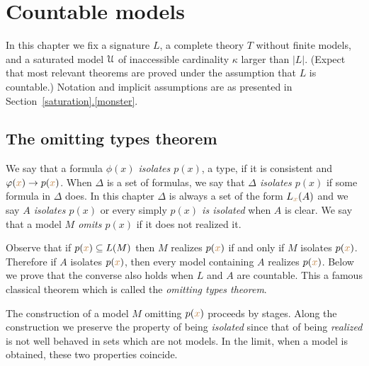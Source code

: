 \documentclass[creche.tex]{subfiles}
\begin{document}
\chapter{Countable models}
\label{countable}

\def\ceq#1#2#3{\parbox[b]{30ex}{$\displaystyle #1$}\parbox[b]{6ex}{\hfil$#2$}$\displaystyle #3$}




In this chapter we fix a signature $L$, a complete theory $T$ without finite models, and a saturated model $\EuScript U$ of inaccessible cardinality $\kappa$ larger than $|L|$. (Expect that most relevant theorems are proved under the assumption that $L$ is countable.) Notation and implicit assumptions are as presented in Section~\hyperref[saturation]{\ref*{saturation}.\ref*{monster}}.



\section{The omitting types theorem}\label{omttingtype}

We say that a formula \emph{$\phi(x)$ isolates $p(x)$}, a type, if it is consistent and $\varphi({\color{brown} x})\rightarrow p({\color{brown} x})$. When $\Delta$ is a set of formulas, we say that \emph{$\Delta$ isolates $p(x)$\/} if some formula in $\Delta$ does. In this chapter $\Delta$ is always a set of the form $L_{{\color{brown} x}}(A)$ and we say  \emph{$A$ isolates $p(x)$\/} or every simply \emph{$p(x)$ is isolated\/} when $A$ is clear. We say that a model \emph{$M$ omits $p(x)$\/} if it does not realized it. 

Observe that if $p({\color{brown} x})\subseteq L(M)$ then $M$ realizes $p({\color{brown} x})$ if and only if $M$ isolates  $p({\color{brown} x})$. Therefore if $A$ isolates $p({\color{brown} x})$, then every model containing $A$ realizes $p({\color{brown} x})$. Below we prove that the converse also holds when $L$ and $A$ are countable. This a famous classical theorem  which is called the \textit{omitting types theorem}. 

The construction of a model $M$ omitting $p({\color{brown} x})$ proceeds by stages. Along the construction we preserve the property of being {\em isolated\/}  since that of being {\em realized\/} is not well behaved in sets which are not models. In the limit, when a model is obtained, these two properties coincide. 
\end{document}
